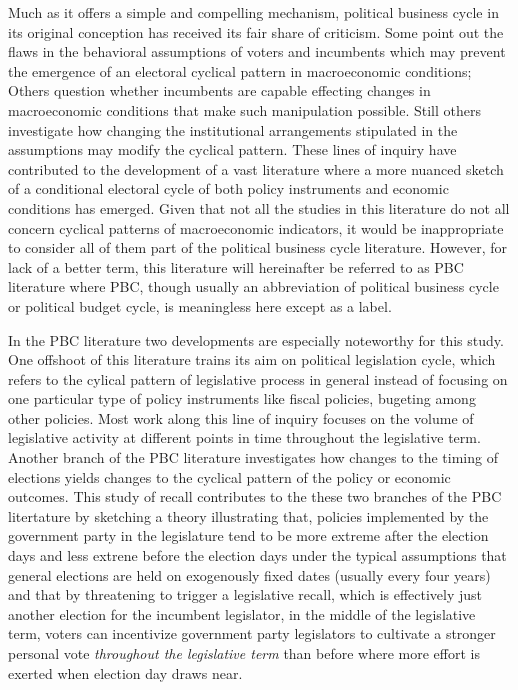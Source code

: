 \documentclass[hyphens, crop=false]{standalone}
\begin{document}
	Much as
	it offers a simple and compelling mechanism,
	political business cycle in its original conception
	has received its fair share of criticism.
	Some point out the flaws in the behavioral assumptions of voters and incumbents
	which may prevent the emergence of an electoral cyclical pattern in macroeconomic conditions;
	Others question whether incumbents
	are capable effecting changes in macroeconomic conditions
	that make such manipulation possible.
	Still others investigate how changing the institutional arrangements
	stipulated in the assumptions may modify the cyclical pattern.
	These lines of inquiry
	have contributed to the development of a vast literature
	where a more nuanced
	sketch of a conditional electoral cycle
	of both policy instruments
	and economic conditions
	has emerged.
	Given that not all the studies in this literature
	do not all concern cyclical patterns of macroeconomic indicators,
	it would be inappropriate to consider all of them
	part of the political business cycle literature.
	However, for lack of a better term,
	this literature will hereinafter be referred to as PBC literature
	where PBC, though usually an abbreviation of political business cycle
	or political budget cycle,
	is meaningless here except as a label.
	
	
	
	
	
	
	In
	the PBC
	literature
	two developments are especially noteworthy for this study.
	One offshoot of
	this
	literature
	trains its aim on
	political legislation cycle,
	which refers to
	the cylical pattern of legislative process in general
	instead of focusing on one particular type of policy instruments
	like fiscal policies, bugeting among other policies.
	Most work along this line of inquiry focuses on
	the volume of legislative activity at different points in time
	throughout the legislative term.
	Another branch of the PBC literature investigates how
	changes to the timing of elections
	yields changes to the cyclical pattern of the policy or economic outcomes.
	This
	study of recall contributes to the these two branches of the
	PBC
	litertature
	by sketching a theory illustrating that,
	policies implemented by the government party in the legislature
	tend to be more extreme after the election days
	and less extrene before the election days
	under the typical assumptions that general elections are held on exogenously fixed dates
	(usually every four years)
	and that
	by threatening to trigger a legislative recall,
	which is effectively just another election for the incumbent legislator,
	in the middle of the legislative term,
	voters can incentivize government party legislators
	to cultivate a stronger personal vote
	\textit{throughout the legislative term}
	than before
	where more effort is exerted when election day draws near.
	
\end{document}
